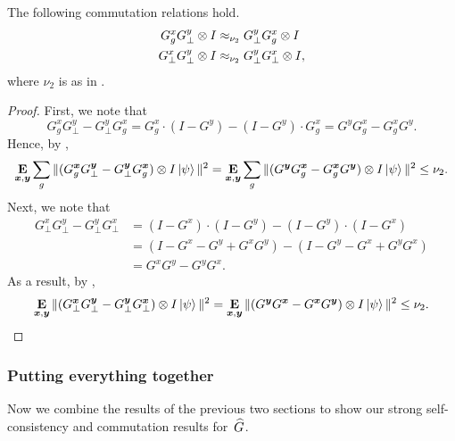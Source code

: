 \begin{corollary}\label{cor:commuting-with-G-incomplete}
The following commutation relations hold.
\begin{align*}
G^x_g  G^y_{\bot} \otimes I &\approx_{\nu_2}  G^y_{\bot} G^x_g \otimes I\\
G^x_{\bot} G^y_{\bot} \otimes I &\approx_{\nu_2}  G^y_{\bot} G^x_{\bot} \otimes I,
\end{align*}
where $\nu_2$ is as in .
\end{corollary}
\begin{proof}
First, we note that
\begin{equation*}
G^x_g  G^y_{\bot} - G^y_{\bot} G^x_g
= G^x_g  \cdot (I - G^y) - (I- G^y)\cdot G^x_g
= G^y G^x_g - G^x_g G^y.
\end{equation*}
Hence, by ,
\begin{equation*}
\mathop{\bf E\/}_{{\boldsymbol{x}}, \boldsymbol{y}}\sum_g \Vert (G^{{\boldsymbol{x}}}_g  G^{\boldsymbol{y}}_{\bot} - G^{\boldsymbol{y}}_{\bot} G^{{\boldsymbol{x}}}_g) \otimes I \ket{\psi} \Vert^2
= \mathop{\bf E\/}_{{\boldsymbol{x}}, \boldsymbol{y}}\sum_g \Vert (G^{\boldsymbol{y}} G^{{\boldsymbol{x}}}_g - G^{{\boldsymbol{x}}}_g G^{\boldsymbol{y}}) \otimes I \ket{\psi} \Vert^2
\leq \nu_2.
\end{equation*}
Next, we note that
\begin{align*}
G^x_{\bot} G^y_{\bot}
- G^y_{\bot} G^x_{\bot}
&= (I - G^x) \cdot (I - G^y) - (I - G^y) \cdot (I - G^x)\\
& = (I - G^x - G^y + G^x G^y) - (I - G^y - G^x + G^y G^x)\\
&= G^x G^y - G^y G^x.
\end{align*}
As a result, by ,
\begin{equation*}
\mathop{\bf E\/}_{{\boldsymbol{x}}, \boldsymbol{y}} \Vert (G^{{\boldsymbol{x}}}_{\bot}  G^{\boldsymbol{y}}_{\bot} - G^{\boldsymbol{y}}_{\bot} G^{{\boldsymbol{x}}}_{\bot}) \otimes I \ket{\psi} \Vert^2
= \mathop{\bf E\/}_{{\boldsymbol{x}}, \boldsymbol{y}} \Vert (G^{\boldsymbol{y}} G^{{\boldsymbol{x}}} - G^{{\boldsymbol{x}}} G^{\boldsymbol{y}}) \otimes I \ket{\psi} \Vert^2
\leq \nu_2.\qedhere
\end{equation*}
\end{proof}

\subsubsection{Putting everything together}

Now we combine the results of the previous two sections
to show our strong self-consistency and commutation results for~$\widehat{G}$.

